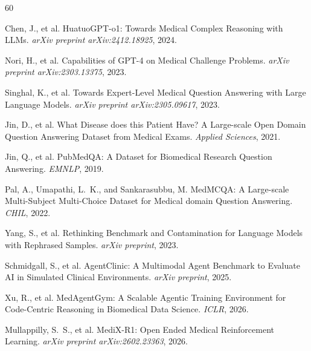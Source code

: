 \documentclass{article}
\begin{document}
\begin{thebibliography}{60}


Chen, J., et al.
\newblock HuatuoGPT-o1: Towards Medical Complex Reasoning with LLMs.
\newblock \emph{arXiv preprint arXiv:2412.18925}, 2024.

Nori, H., et al.
\newblock Capabilities of GPT-4 on Medical Challenge Problems.
\newblock \emph{arXiv preprint arXiv:2303.13375}, 2023.

Singhal, K., et al.
\newblock Towards Expert-Level Medical Question Answering with Large Language Models.
\newblock \emph{arXiv preprint arXiv:2305.09617}, 2023.


Jin, D., et al.
\newblock What Disease does this Patient Have? A Large-scale Open Domain Question Answering Dataset from Medical Exams.
\newblock \emph{Applied Sciences}, 2021.

Jin, Q., et al.
\newblock PubMedQA: A Dataset for Biomedical Research Question Answering.
\newblock \emph{EMNLP}, 2019.

Pal, A., Umapathi, L.~K., and Sankarasubbu, M.
\newblock MedMCQA: A Large-scale Multi-Subject Multi-Choice Dataset for Medical domain Question Answering.
\newblock \emph{CHIL}, 2022.

Yang, S., et al.
\newblock Rethinking Benchmark and Contamination for Language Models with Rephrased Samples.
\newblock \emph{arXiv preprint}, 2023.


Schmidgall, S., et al.
\newblock AgentClinic: A Multimodal Agent Benchmark to Evaluate AI in Simulated Clinical Environments.
\newblock \emph{arXiv preprint}, 2025.

Xu, R., et al.
\newblock MedAgentGym: A Scalable Agentic Training Environment for Code-Centric Reasoning in Biomedical Data Science.
\newblock \emph{ICLR}, 2026.

Mullappilly, S.~S., et al.
\newblock MediX-R1: Open Ended Medical Reinforcement Learning.
\newblock \emph{arXiv preprint arXiv:2602.23363}, 2026.


\end{thebibliography}
\end{document}

